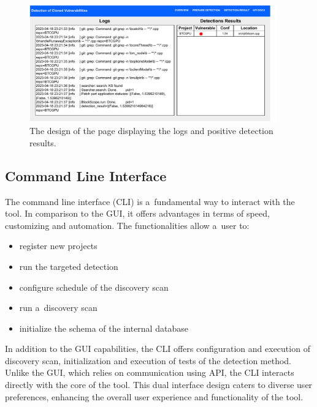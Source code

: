   \begin{figure}[h]
    \centering
    \includegraphics[width=0.95\textwidth]{obrazky-figures/cg_web_results.drawio.pdf}
    \caption{The design of the page displaying the logs and positive detection results.}
    \label{cg-web-results}
  \end{figure} %

  \subsection*{Command Line Interface}
  The command line interface (CLI) is a~fundamental way to interact with the tool. In comparison to the GUI,
  it offers advantages in terms of speed, customizing and automation. The functionalities allow a~user to:
  \begin{itemize}
    \item register new projects
    \item run the targeted detection
    \item configure schedule of the discovery scan
    \item run a~discovery scan
    \item initialize the schema of the internal database
  \end{itemize}

  In addition to the GUI capabilities, the CLI offers configuration and execution of discovery scan, initialization
  and execution of tests of the detection method. Unlike the GUI, which relies on communication using API, the CLI interacts
  directly with the core of the tool. This dual interface design caters to diverse user preferences, enhancing the overall
  user experience and functionality of the tool.
